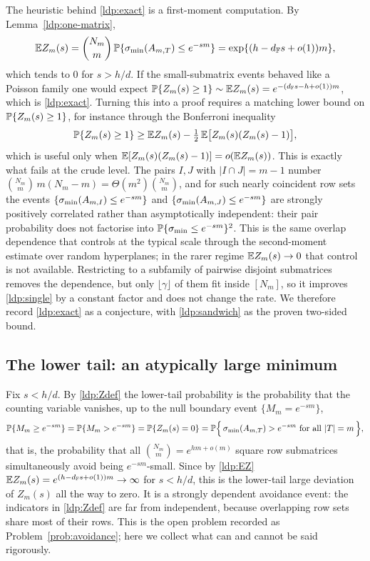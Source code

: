 The heuristic behind \eqref{ldp:exact} is a first-moment computation.  By
Lemma~\ref{ldp:one-matrix},
\begin{equation}\label{ldp:EZ}
  \mathbb{E} Z_m(s)=\binom{N_m}{m}\,\mathbb{P}\{\sigma_{\min}(A_{m,T})\le e^{-sm}\}
           =\exp\{(h-d_{\mathbb{F}} s+o(1))m\},
\end{equation}
which tends to \(0\) for \(s>h/d\).  If the small-submatrix events behaved like a
Poisson family one would expect
\(\mathbb{P}\{Z_m(s)\ge1\}\sim\mathbb{E} Z_m(s)=e^{-(d_{\mathbb{F}} s-h+o(1))m}\), which is
\eqref{ldp:exact}.  Turning this into a proof requires a matching lower bound on
\(\mathbb{P}\{Z_m(s)\ge1\}\), for instance through the Bonferroni inequality
\[
  \mathbb{P}\{Z_m(s)\ge1\}\ge \mathbb{E} Z_m(s)-\tfrac12\,\mathbb{E}\big[Z_m(s)(Z_m(s)-1)\big],
\]
which is useful only when
\(\mathbb{E}[Z_m(s)(Z_m(s)-1)]=o(\mathbb{E} Z_m(s))\).  This is exactly what fails at the crude
level.  The pairs \(I,J\) with \(|I\cap J|=m-1\) number
\(\binom{N_m}{m}\,m(N_m-m)=\Theta(m^2)\binom{N_m}{m}\), and for such nearly
coincident row sets the events \(\{\sigma_{\min}(A_{m,I})\le e^{-sm}\}\) and
\(\{\sigma_{\min}(A_{m,J})\le e^{-sm}\}\) are strongly positively correlated rather than
asymptotically independent: their pair probability does not factorise into
\(\mathbb{P}\{\sigma_{\min}\le e^{-sm}\}^2\).  This is the same overlap dependence that
\cite{ShmaloExtremal2026} controls at the typical scale through the second-moment
estimate over random hyperplanes; in the rarer regime \(\mathbb{E} Z_m(s)\to0\) that
control is not available.  Restricting to a subfamily of pairwise disjoint
submatrices removes the dependence, but only \(\lfloor\gamma\rfloor\) of them fit
inside \([N_m]\), so it improves \eqref{ldp:single} by a constant factor and does
not change the rate.  We therefore record \eqref{ldp:exact} as a conjecture, with
\eqref{ldp:sandwich} as the proven two-sided bound.

\subsection{The lower tail: an atypically large minimum}

Fix \(s<h/d\).  By \eqref{ldp:Zdef} the lower-tail probability is the probability
that the counting variable vanishes, up to the null boundary event
\(\{M_m=e^{-sm}\}\),
\begin{equation}\label{ldp:hole}
  \mathbb{P}\{M_m\ge e^{-sm}\}=\mathbb{P}\{M_m>e^{-sm}\}=\mathbb{P}\{Z_m(s)=0\}
  =\mathbb{P}\Big\{\,\sigma_{\min}(A_{m,T})> e^{-sm}\ \text{for all } |T|=m\,\Big\},
\end{equation}
that is, the probability that all \(\binom{N_m}{m}=e^{hm+o(m)}\) square row
submatrices simultaneously avoid being \(e^{-sm}\)-small.  Since by \eqref{ldp:EZ}
\(\mathbb{E} Z_m(s)=e^{(h-d_{\mathbb{F}} s+o(1))m}\to\infty\) for \(s<h/d\), this is the lower-tail
large deviation of \(Z_m(s)\) all the way to zero.  It is a strongly dependent
avoidance event: the indicators in \eqref{ldp:Zdef} are far from independent,
because overlapping row sets share most of their rows.  This is the open problem
recorded as Problem~\ref{prob:avoidance}; here we collect what can and cannot be
said rigorously.

